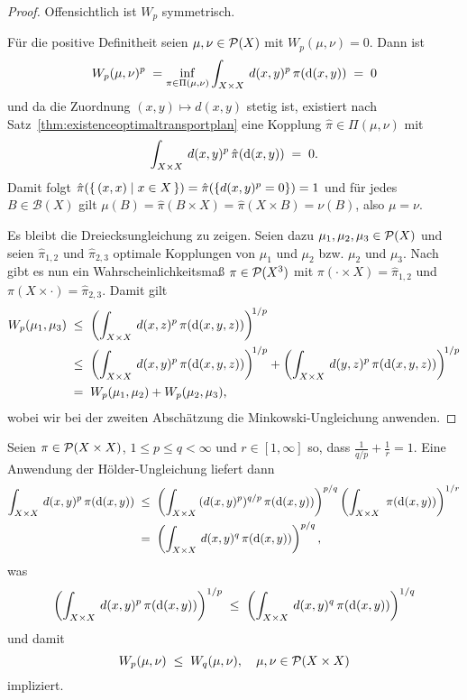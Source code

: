 \documentclass[../main/main.tex]{subfiles}
\begin{document}
	\begin{proof}
		Offensichtlich ist $W_p$ symmetrisch.
		
		Für die positive Definitheit seien $\mu, \nu \in \mathcal{P}(X)$ mit $W_p(\mu, \nu) = 0$. Dann ist
		\[ W_p(\mu, \nu)^p \; = \inf_{\pi \in \Pi(\mu, \nu)} \int_{X \times X} \, d(x, y)^p \, \pi(\mathrm{d}(x, y)) \; = \; 0 \]
		und da die Zuordnung $(x, y) \mapsto d(x, y)$ stetig ist, existiert nach Satz~\ref{thm:existenceoptimaltransportplan} eine Kopplung $\hat{\pi} \in \Pi(\mu, \nu)$ mit
		\[ \int_{X \times X} \, d(x, y)^p \, \hat{\pi}(\mathrm{d}(x, y)) \; = \; 0 \text{.} \]
		Damit folgt $\hat{\pi}(\left\{\, (x, x) \; \middle| \; x \in X \,\right\}) = \hat{\pi}(\left\{d(x, y)^p = 0\right\}) = 1$ und für jedes $B \in \mathcal{B}(X)$ gilt
		$\mu(B) = \hat{\pi}(B \times X) = \hat{\pi}(X \times B) = \nu(B)$, also $\mu = \nu$.
		
		Es bleibt die Dreiecksungleichung zu zeigen. Seien dazu $\mu_1, \mu_2, \mu_3 \in \mathcal{P}(X)$ und seien $\hat{\pi}_{1, 2}$ und $\hat{\pi}_{2, 3}$ optimale Kopplungen von
		$\mu_1$ und $\mu_2$ bzw. $\mu_2$ und $\mu_3$. Nach \cite[S. 23-24]{Villani.2009} gibt es nun ein Wahrscheinlichkeitsmaß $\pi \in \mathcal{P}(X^3)$ mit 
		$\pi(\cdot \times X) = \hat{\pi}_{1, 2}$ und $\pi(X \times \cdot) = \hat{\pi}_{2, 3}$. Damit gilt
		\begin{align*}
			W_p(\mu_1, \mu_3) \; &\leq \; \left(\int_{X \times X} \, d(x, z)^p \, \pi(\mathrm{d}(x, y, z))\right)^{\! 1/p} \\
			                     &\leq \; \left(\int_{X \times X} \, d(x, y)^p \, \pi(\mathrm{d}(x, y, z))\right)^{\! 1/p} + \left(\int_{X \times X} \, d(y, z)^p \, \pi(\mathrm{d}(x, y, z))\right)^{\! 1/p} \\
			                     &=    \; W_p(\mu_1, \mu_2) + W_p(\mu_2, \mu_3) \text{,}
		\end{align*}
		wobei wir bei der zweiten Abschätzung die Minkowski-Ungleichung anwenden.
	\end{proof}

	\begin{Bemerkung}
		Seien $\pi \in \mathcal{P}(X \times X)$, $1 \leq p \leq q < \infty$ und $r \in [1, \infty]$ so, dass $\frac{1}{q/p} + \frac{1}{r} = 1$. Eine Anwendung der Hölder-Ungleichung liefert dann
		\begin{align*}
			\int_{X \times X} \, d(x, y)^p \, \pi(\mathrm{d}(x, y)) \; &\leq \; \left( \int_{X \times X} \, (d(x, y)^p)^{q/p} \, \pi(\mathrm{d}(x, y)) \right)^{p/q} \left( \int_{X \times X} \,  \, \pi(\mathrm{d}(x, y)) \right)^{1/r} \\
			                                                    &=    \; \left( \int_{X \times X} \, d(x, y)^q \, \pi(\mathrm{d}(x, y)) \right)^{p/q} \text{,}
		\end{align*}
		was
		\[ \left( \int_{X \times X} \, d(x, y)^p \, \pi(\mathrm{d}(x, y)) \right)^{1/p} \; \leq \; \left( \int_{X \times X} \, d(x, y)^q \, \pi(\mathrm{d}(x, y)) \right)^{1/q} \]
		und damit
		\[ W_p(\mu, \nu) \; \leq \; W_q(\mu, \nu), \quad \mu, \nu \in \mathcal{P}(X \times X) \]
		impliziert.
	\end{Bemerkung}
\end{document}
